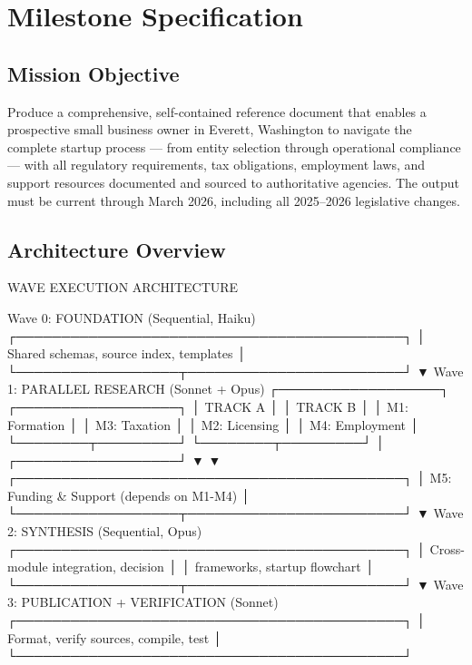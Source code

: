 \documentclass[11pt,letterpaper]{article}
\newcommand{\stageheader}[2]{%
  \noindent\colorbox{#2}{\makebox[\textwidth][l]{%
    \textcolor{white}{\bfseries\sffamily\hspace{6pt}#1\hspace{6pt}}}}%
  \vspace{0.5em}\par%
}
\begin{document}
\newpage

\stageheader{STAGE 3 --- MISSION PACKAGE}{tertiary}

\section{Milestone Specification}

\subsection{Mission Objective}

Produce a comprehensive, self-contained reference document that enables a prospective small business owner in Everett, Washington to navigate the complete startup process --- from entity selection through operational compliance --- with all regulatory requirements, tax obligations, employment laws, and support resources documented and sourced to authoritative agencies. The output must be current through March 2026, including all 2025--2026 legislative changes.

\subsection{Architecture Overview}

\begin{asciibox}
  WAVE EXECUTION ARCHITECTURE

  Wave 0: FOUNDATION (Sequential, Haiku)
  ┌───────────────────────────────────────────┐
  │  Shared schemas, source index, templates  │
  └──────────────────┬────────────────────────┘
                     ▼
  Wave 1: PARALLEL RESEARCH (Sonnet + Opus)
  ┌──────────────────┐    ┌──────────────────┐
  │  TRACK A          │    │  TRACK B          │
  │  M1: Formation    │    │  M3: Taxation     │
  │  M2: Licensing    │    │  M4: Employment   │
  └────────┬─────────┘    └────────┬─────────┘
           │    ┌──────────────────┘
           ▼    ▼
  ┌───────────────────────────────────────────┐
  │  M5: Funding & Support (depends on M1-M4) │
  └──────────────────┬────────────────────────┘
                     ▼
  Wave 2: SYNTHESIS (Sequential, Opus)
  ┌───────────────────────────────────────────┐
  │  Cross-module integration, decision       │
  │  frameworks, startup flowchart            │
  └──────────────────┬────────────────────────┘
                     ▼
  Wave 3: PUBLICATION + VERIFICATION (Sonnet)
  ┌───────────────────────────────────────────┐
  │  Format, verify sources, compile, test    │
  └───────────────────────────────────────────┘
\end{asciibox}
\end{document}
